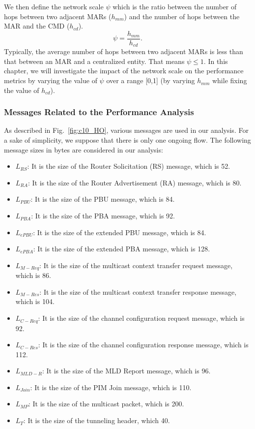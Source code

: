 We then define the network scale $\psi$ which is the ratio between the number of hops between two adjacent MARs ($h_{mm}$) and the number of hops between the MAR and the CMD ($h_{cd}$).\\
\begin{equation}
\psi = \frac{h_{mm}}{h_{cd}}.
\end{equation} 
Typically, the average number of hops between two adjacent MARs is less than that between an MAR and a centralized entity. That means $\psi \leq 1$. In this chapter, we will investigate the impact of the network scale on the performance metrics by varying the value of $\psi$ over a range [0,1] (by varying $h_{mm}$ while fixing the value of $h_{cd}$). 
\subsubsection{Messages Related to the Performance Analysis}
As described in Fig.~\ref{fig:c10_HO}, various messages are used in our analysis. For a sake of simplicity, we suppose that there is only one ongoing flow. The following message sizes in bytes are considered in our analysis:
\begin{itemize}
\item $L_{RS}$: It is the size of the Router Solicitation (RS) message, which is 52.
\item $L_{RA}$: It is the size of the Router Advertisement (RA) message, which is 80.
\item $L_{PBU}$: It is the size of the PBU message, which is 84.
\item $L_{PBA}$: It is the size of the PBA message, which is 92.
\item $L_{ePBU}$: It is the size of the extended PBU message, which is 84.
\item $L_{ePBA}$: It is the size of the extended PBA message, which is 128.
\item $L_{M-Req}$: It is the size of the multicast context transfer request message, which is 86.
\item $L_{M-Res}$: It is the size of the multicast context transfer response message, which is 104.
\item $L_{C-Req}$: It is the size of the channel configuration request message, which is 92.
\item $L_{C-Res}$: It is the size of the channel configuration response message, which is 112. 
\item $L_{MLD-R}$: It is the size of the MLD Report message, which is 96.
\item $L_{Join}$: It is the size of the PIM Join message, which is 110.
\item $L_{MP}$: It is the size of the multicast packet, which is 200.
\item $L_{T}$: It is the size of the tunneling header, which 40.  
\end{itemize}

